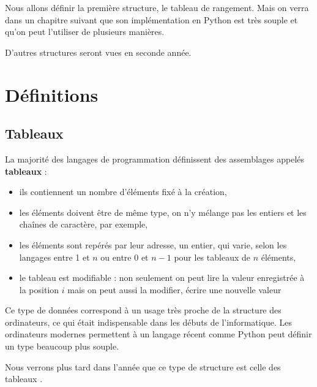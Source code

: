 Nous allons définir la première structure, le tableau de rangement. Mais on verra dans un chapitre suivant que son implémentation en Python est très souple et qu'on peut l'utiliser de plusieurs manières.

D'autres structures seront vues en seconde année.
\section{Définitions}
\subsection{Tableaux}
La majorité des langages de programmation définissent des assemblages appelés {\bf tableaux} :

\begin{itemize}
\item ils contiennent un nombre d'éléments fixé à la création,
\item les éléments doivent être de même type, on n'y mélange pas les entiers et les chaînes de caractère, par exemple,
\item les éléments sont repérés par leur adresse, un entier, qui varie, selon les langages entre 1 et $n$ ou entre 0 et $n-1$ pour les tableaux de $n$ éléments,
\item le tableau est modifiable : non seulement on peut lire la valeur enregistrée à la position $i$ mais on peut aussi la modifier, écrire une nouvelle valeur
\end{itemize}
Ce type de données correspond à un usage très proche de la structure des ordinateurs, ce qui était indispensable dans les débuts de l'informatique. Les ordinateurs modernes permettent à un langage récent comme Python peut définir un type beaucoup plus souple.

Nous verrons plus tard dans l'année que ce type de structure est celle des tableaux .

